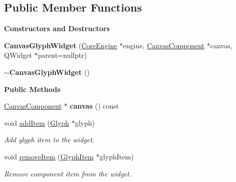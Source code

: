 \subsection*{Public Member Functions}
\begin{Indent}\textbf{ Constructors and Destructors}\par
\begin{DoxyCompactItemize}
\item 
\mbox{\label{classrev_1_1_view_1_1_canvas_glyph_widget_a43d092719c68e11ed2495e6f9bf53c11}} 
{\bfseries Canvas\+Glyph\+Widget} (\mbox{\hyperlink{classrev_1_1_core_engine}{Core\+Engine}} $\ast$engine, \mbox{\hyperlink{classrev_1_1_canvas_component}{Canvas\+Component}} $\ast$canvas, Q\+Widget $\ast$parent=nullptr)
\item 
\mbox{\label{classrev_1_1_view_1_1_canvas_glyph_widget_a89a3f35f34db9751e1720b0882f74e3b}} 
{\bfseries $\sim$\+Canvas\+Glyph\+Widget} ()
\end{DoxyCompactItemize}
\end{Indent}
\begin{Indent}\textbf{ Public Methods}\par
\begin{DoxyCompactItemize}
\item 
\mbox{\label{classrev_1_1_view_1_1_canvas_glyph_widget_a6a7c58e8c3fffb5c3c3dbfd72995f96d}} 
\mbox{\hyperlink{classrev_1_1_canvas_component}{Canvas\+Component}} $\ast$ {\bfseries canvas} () const
\item 
\mbox{\label{classrev_1_1_view_1_1_canvas_glyph_widget_a8b47ce9cf9d91ac0d2a347a653186204}} 
void \mbox{\hyperlink{classrev_1_1_view_1_1_canvas_glyph_widget_a8b47ce9cf9d91ac0d2a347a653186204}{add\+Item}} (\mbox{\hyperlink{classrev_1_1_glyph}{Glyph}} $\ast$glyph)
\begin{DoxyCompactList}\small\item\em Add glyph item to the widget. \end{DoxyCompactList}\item 
\mbox{\label{classrev_1_1_view_1_1_canvas_glyph_widget_a050d143a9e11e2a1af7100f6ee49d43d}} 
void \mbox{\hyperlink{classrev_1_1_view_1_1_canvas_glyph_widget_a050d143a9e11e2a1af7100f6ee49d43d}{remove\+Item}} (\mbox{\hyperlink{classrev_1_1_view_1_1_glyph_item}{Glyph\+Item}} $\ast$glyph\+Item)
\begin{DoxyCompactList}\small\item\em Remove component item from the widget. \end{DoxyCompactList}\end{DoxyCompactItemize}
\end{Indent}
